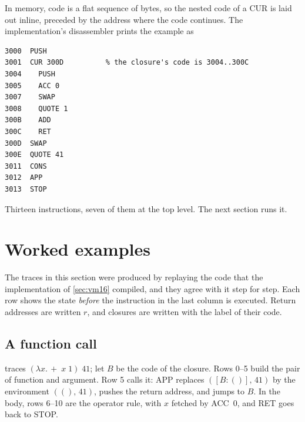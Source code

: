 \documentclass[11pt,a4paper]{article}
\newcommand{\ins}[1]{\textsf{#1}}
\newcommand{\clo}[2]{[#1 : #2]}
\newcommand{\pr}[2]{(#1,\, #2)}
\newcommand{\unit}{()}
\theoremstyle{definition}
\theoremstyle{plain}
\begin{document}
In memory, code is a flat sequence of bytes, so the nested code of a \ins{CUR}
is laid out inline, preceded by the address where the code continues. The
implementation's disassembler prints the example as
\begin{lstlisting}[style=cam]
3000  PUSH
3001  CUR 300D          % the closure's code is 3004..300C
3004    PUSH
3005    ACC 0
3007    SWAP
3008    QUOTE 1
300B    ADD
300C    RET
300D  SWAP
300E  QUOTE 41
3011  CONS
3012  APP
3013  STOP
\end{lstlisting}
Thirteen instructions, seven of them at the top level. The next section runs
it.

\section{Worked examples}\label{sec:examples}

The traces in this section were produced by replaying the code that the
implementation of \cref{sec:vm16} compiled, and they agree with it step for
step. Each row shows the state \emph{before} the instruction in the last
column is executed. Return addresses are written $r$, and closures are written
with the label of their code.

\subsection{A function call}

 traces $(\lambda x.\,{+}\;x\;1)\;41$; let $B$ be the code
of the closure. Rows 0--5 build the pair of function and argument. Row 5
calls it: \ins{APP} replaces $\pr{\clo{B}{\unit}}{41}$ by the environment
$\pr{\unit}{41}$, pushes the return address, and jumps to $B$. In the body,
rows 6--10 are the operator rule, with $x$ fetched by \ins{ACC}~0, and
\ins{RET} goes back to \ins{STOP}.
\end{document}
